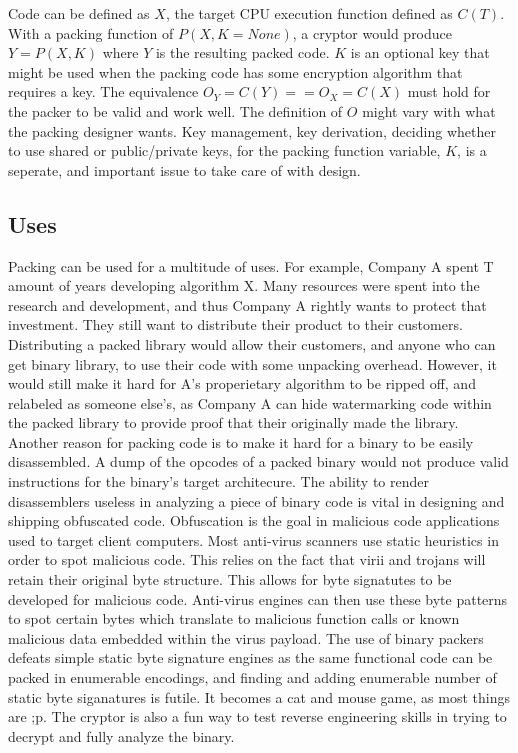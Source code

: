 \documentclass{article}
\begin{document}
Code can be defined as $X$,  the target CPU execution function defined as $C(T)$. With a packing function of $P(X, K=None)$, a cryptor would produce $Y = P(X, K)$ where $Y$ is the resulting packed code. $K$ is an optional key that might be used when the packing code has some encryption algorithm that requires a key. The equivalence $O_Y = C(Y) == O_X = C(X)$ must hold for the packer to be valid and work well. The definition of $O$ might vary with what the packing designer wants. Key management, key derivation, deciding whether to use shared or public/private keys, for the packing function variable, $K$, is a seperate, and important issue to take care of with design. \newline

\subsection{Uses}
Packing can be used for a multitude of uses. For example, Company A spent T amount of years developing algorithm X. Many resources were spent into the research and development, and thus Company A rightly wants to protect that investment. They still want to distribute their product to their customers. Distributing a packed library would allow their customers, and anyone who can get binary library, to use their code with some unpacking overhead. However, it would still make it hard for A's properietary algorithm to be ripped off, and relabeled as someone else's, as Company A can hide watermarking code within the packed library to provide proof that their originally made the library. Another reason for packing code is to make it hard for a binary to be easily disassembled. A dump of the opcodes of a packed binary would not produce valid instructions for the binary's target architecure. The ability to render disassemblers useless in analyzing a piece of binary code is vital in designing and shipping obfuscated code. Obfuscation is the goal in malicious code applications used to target client computers. Most anti-virus scanners use static heuristics in order to spot malicious code. This relies on the fact that virii and trojans will retain their original byte structure. This allows for byte signatutes to be developed for malicious code. Anti-virus engines can then use these byte patterns to spot certain bytes which translate to malicious function calls or known malicious data embedded within the virus payload. The use of binary packers defeats simple static byte signature engines as the same functional code can be packed in enumerable encodings, and finding and adding enumerable number of static byte siganatures is futile. It becomes a cat and mouse game, as most things are ;p. The cryptor is also a fun way to test reverse engineering skills in trying to decrypt and fully analyze the binary. \newpage
\end{document}
